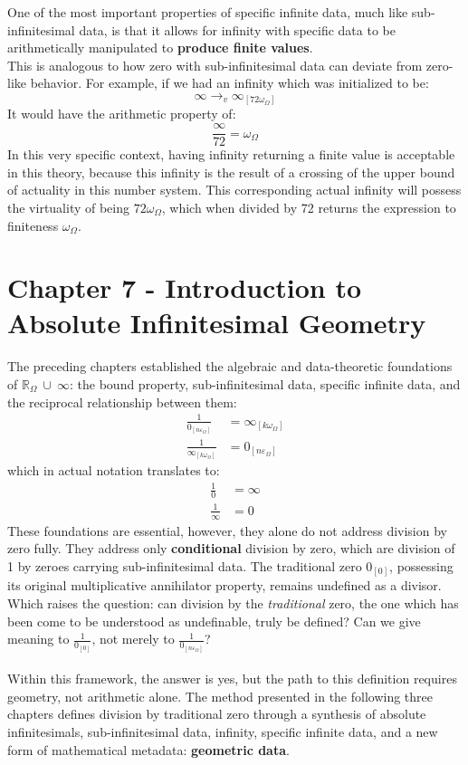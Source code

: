 \documentclass{article}
\begin{document}
One of the most important properties of specific infinite data, much like sub-infinitesimal data, is that it allows for infinity with specific data to be arithmetically manipulated to \textbf{produce finite values}.
\\This is analogous to how zero with sub-infinitesimal data can deviate from zero-like behavior. For example, if we had an infinity which was initialized to be:
$$\infty\to_v \infty_{[72\omega_\Omega]}$$ It would have the arithmetic property of:
$$\frac{\infty}{72} =\omega_\Omega$$
In this very specific context, having infinity returning a finite value is acceptable in this theory, because this infinity is the result of a crossing of the upper bound of actuality in this number system. This corresponding actual infinity will possess the virtuality of being $72\omega_\Omega$, which when divided by 72 returns the expression to finiteness $\omega_\Omega$.

\newpage
\section{Chapter 7 - Introduction to Absolute Infinitesimal Geometry}

The preceding chapters established the algebraic and data-theoretic foundations 
of $\mathbb{R}_\Omega \ \cup \ \infty$: the bound property, sub-infinitesimal data, specific 
infinite data, and the reciprocal relationship between them:
\begin{align*}
\frac{1}{0_{[n\varepsilon_\Omega]}} &= \infty_{[k\omega_\Omega]} \\
\frac{1}{\infty_{[k\omega_\Omega]}} &= 0_{[n\varepsilon_\Omega]}
\end{align*}
which in actual notation translates to:
\begin{align*}
\frac{1}{0} &= \infty \\
\frac{1}{\infty} &= 0
\end{align*}
These foundations are essential, however, they alone do not address division by zero fully. They address only \textbf{conditional} division by zero, which are division of 1 by zeroes carrying sub-infinitesimal data. The traditional zero $0_{[0]}$, possessing its original multiplicative annihilator property, remains undefined as a divisor. Which raises the question: can division by the \textit{traditional} zero, the one which has been come to be understood as undefinable, truly be defined? Can we give meaning to $\frac{1}{0_{[0]}}$, not merely to $\frac{1}{0_{[n\varepsilon_\Omega]}}$?
\\\\Within this framework, the answer is yes, but the path to this definition requires geometry, not arithmetic alone. The method presented in the following three chapters defines division by traditional zero through a synthesis of absolute infinitesimals, sub-infinitesimal data, infinity, specific infinite data, and a new form of mathematical metadata: \textbf{geometric data}. 
\end{document}
